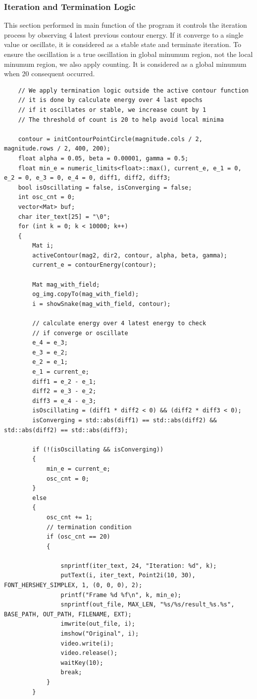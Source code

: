 \documentclass[12pt,a4paper]{report}
\begin{document}
\subsubsection{Iteration and Termination Logic}
This section performed in main function of the program it controls the iteration process by observing 4 latest previous contour energy. If it converge to a single value or oscillate, it is considered as a stable state and terminate iteration. To ensure the oscillation is a true oscillation in global minumum region, not the local minumum region, we also apply counting. It is considered as a global minumum when 20 consequent occurred.
\begin{lstlisting}
    // We apply termination logic outside the active contour function
    // it is done by calculate energy over 4 last epochs
    // if it oscillates or stable, we increase count by 1
    // The threshold of count is 20 to help avoid local minima

    contour = initContourPointCircle(magnitude.cols / 2, magnitude.rows / 2, 400, 200);
    float alpha = 0.05, beta = 0.00001, gamma = 0.5;
    float min_e = numeric_limits<float>::max(), current_e, e_1 = 0, e_2 = 0, e_3 = 0, e_4 = 0, diff1, diff2, diff3;
    bool isOscillating = false, isConverging = false;
    int osc_cnt = 0;
    vector<Mat> buf;
    char iter_text[25] = "\0";
    for (int k = 0; k < 10000; k++)
    {
        Mat i;
        activeContour(mag2, dir2, contour, alpha, beta, gamma);
        current_e = contourEnergy(contour);

        Mat mag_with_field;
        og_img.copyTo(mag_with_field);
        i = showSnake(mag_with_field, contour);

        // calculate energy over 4 latest energy to check
        // if converge or oscillate
        e_4 = e_3;
        e_3 = e_2;
        e_2 = e_1;
        e_1 = current_e;
        diff1 = e_2 - e_1;
        diff2 = e_3 - e_2;
        diff3 = e_4 - e_3;
        isOscillating = (diff1 * diff2 < 0) && (diff2 * diff3 < 0);
        isConverging = std::abs(diff1) == std::abs(diff2) && std::abs(diff2) == std::abs(diff3);

        if (!(isOscillating && isConverging))
        {
            min_e = current_e;
            osc_cnt = 0;
        }
        else
        {
            osc_cnt += 1;
            // termination condition
            if (osc_cnt == 20)
            {

                snprintf(iter_text, 24, "Iteration: %d", k);
                putText(i, iter_text, Point2i(10, 30), FONT_HERSHEY_SIMPLEX, 1, (0, 0, 0), 2);
                printf("Frame %d %f\n", k, min_e);
                snprintf(out_file, MAX_LEN, "%s/%s/result_%s.%s", BASE_PATH, OUT_PATH, FILENAME, EXT);
                imwrite(out_file, i);
                imshow("Original", i);
                video.write(i);
                video.release();
                waitKey(10);
                break;
            }
        }


\end{lstlisting}
\end{document}
